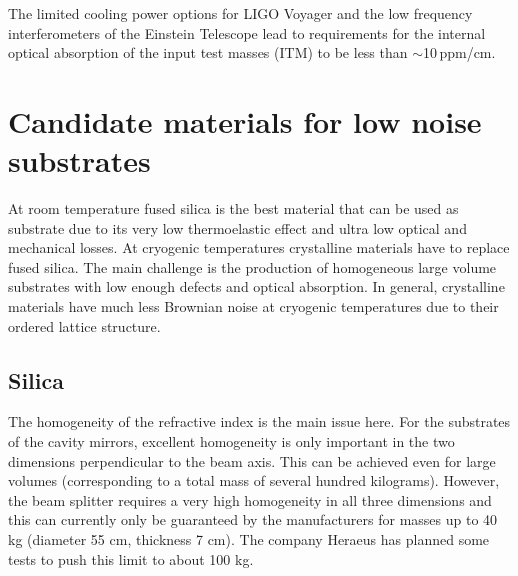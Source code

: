 
The limited cooling power options for LIGO Voyager and the low frequency interferometers of the Einstein Telescope lead to requirements for the internal optical absorption of the input test masses (ITM) to be less than $\sim$10\,ppm/cm.

\section{Candidate materials for low noise substrates}
At room temperature fused silica is the best material that can be used as substrate due to its very low thermoelastic effect and ultra low optical and mechanical losses.
At cryogenic temperatures crystalline materials have to replace fused silica. The main challenge is the production of homogeneous large volume substrates with low enough defects and optical absorption. In general, crystalline materials have much less Brownian noise at cryogenic temperatures due to their ordered lattice structure.
\subsection{Silica}
The homogeneity of the refractive index is the main issue here. For the substrates of the cavity mirrors, excellent homogeneity is only important in the two dimensions perpendicular to the beam axis. This can be achieved even for large volumes (corresponding to a total mass of several hundred kilograms). However, the beam splitter requires a very high homogeneity in all three dimensions and this can currently only be guaranteed by the manufacturers for masses up to 40 kg (diameter 55 cm, thickness 7 cm). The company Heraeus has planned some tests to push this limit to about 100 kg.
